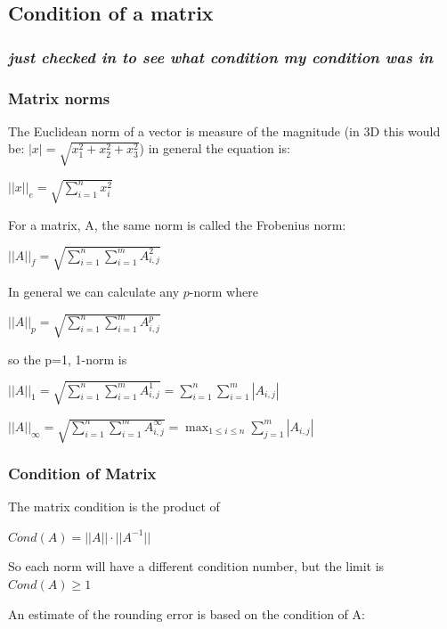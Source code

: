 \documentclass[11pt]{article}
\begin{document}
    \subsection{Condition of a matrix}\label{condition-of-a-matrix}

\subsubsection{\texorpdfstring{\emph{just checked in to see what
condition my condition was
in}}{just checked in to see what condition my condition was in}}\label{just-checked-in-to-see-what-condition-my-condition-was-in}

\subsubsection{Matrix norms}\label{matrix-norms}

The Euclidean norm of a vector is measure of the magnitude (in 3D this
would be: \(|x|=\sqrt{x_{1}^{2}+x_{2}^{2}+x_{3}^{2}}\)) in general the
equation is:

\(||x||_{e}=\sqrt{\sum_{i=1}^{n}x_{i}^{2}}\)

For a matrix, A, the same norm is called the Frobenius norm:

\(||A||_{f}=\sqrt{\sum_{i=1}^{n}\sum_{i=1}^{m}A_{i,j}^{2}}\)

In general we can calculate any \(p\)-norm where

\(||A||_{p}=\sqrt{\sum_{i=1}^{n}\sum_{i=1}^{m}A_{i,j}^{p}}\)

so the p=1, 1-norm is

\(||A||_{1}=\sqrt{\sum_{i=1}^{n}\sum_{i=1}^{m}A_{i,j}^{1}}=\sum_{i=1}^{n}\sum_{i=1}^{m}|A_{i,j}|\)

\(||A||_{\infty}=\sqrt{\sum_{i=1}^{n}\sum_{i=1}^{m}A_{i,j}^{\infty}}=\max_{1\le i \le n}\sum_{j=1}^{m}|A_{i,j}|\)

\subsubsection{Condition of Matrix}\label{condition-of-matrix}

The matrix condition is the product of

\(Cond(A) = ||A||\cdot||A^{-1}||\)

So each norm will have a different condition number, but the limit is
\(Cond(A)\ge 1\)

An estimate of the rounding error is based on the condition of A:
\end{document}
